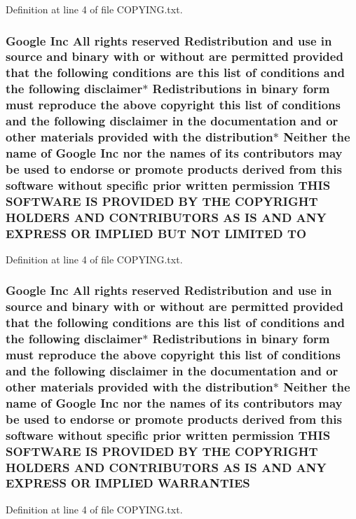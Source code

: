 Definition at line 4 of file C\+O\+P\+Y\+I\+N\+G.\+txt.

\subsubsection[{\texorpdfstring{TO}{TO}}]{\setlength{\rightskip}{0pt plus 5cm}Google Inc All rights reserved Redistribution and use in source and binary with or without are permitted provided that the following conditions are this {\bf list} of conditions and the following disclaimer$\ast$ Redistributions in binary form must reproduce the above copyright this {\bf list} of conditions and the following disclaimer in the documentation and or other materials provided with the distribution$\ast$ Neither the name of Google Inc nor the names of its contributors may be used to endorse or promote products derived from this software without specific prior written permission T\+H\+IS S\+O\+F\+T\+W\+A\+RE IS P\+R\+O\+V\+I\+D\+ED BY T\+HE C\+O\+P\+Y\+R\+I\+G\+HT H\+O\+L\+D\+E\+RS A\+ND C\+O\+N\+T\+R\+I\+B\+U\+T\+O\+RS AS IS A\+ND A\+NY E\+X\+P\+R\+E\+SS OR I\+M\+P\+L\+I\+ED B\+UT N\+OT L\+I\+M\+I\+T\+ED TO}\hypertarget{COPYING_8txt_a4b42230e232228783545c1173b0ac51d}{}\label{COPYING_8txt_a4b42230e232228783545c1173b0ac51d}


Definition at line 4 of file C\+O\+P\+Y\+I\+N\+G.\+txt.

\subsubsection[{\texorpdfstring{W\+A\+R\+R\+A\+N\+T\+I\+ES}{WARRANTIES}}]{\setlength{\rightskip}{0pt plus 5cm}Google Inc All rights reserved Redistribution and use in source and binary with or without are permitted provided that the following conditions are this {\bf list} of conditions and the following disclaimer$\ast$ Redistributions in binary form must reproduce the above copyright this {\bf list} of conditions and the following disclaimer in the documentation and or other materials provided with the distribution$\ast$ Neither the name of Google Inc nor the names of its contributors may be used to endorse or promote products derived from this software without specific prior written permission T\+H\+IS S\+O\+F\+T\+W\+A\+RE IS P\+R\+O\+V\+I\+D\+ED BY T\+HE C\+O\+P\+Y\+R\+I\+G\+HT H\+O\+L\+D\+E\+RS A\+ND C\+O\+N\+T\+R\+I\+B\+U\+T\+O\+RS AS IS A\+ND A\+NY E\+X\+P\+R\+E\+SS OR I\+M\+P\+L\+I\+ED W\+A\+R\+R\+A\+N\+T\+I\+ES}\hypertarget{COPYING_8txt_ac62ff2f8b2f565a26b35ecca12f17f4a}{}\label{COPYING_8txt_ac62ff2f8b2f565a26b35ecca12f17f4a}


Definition at line 4 of file C\+O\+P\+Y\+I\+N\+G.\+txt.

